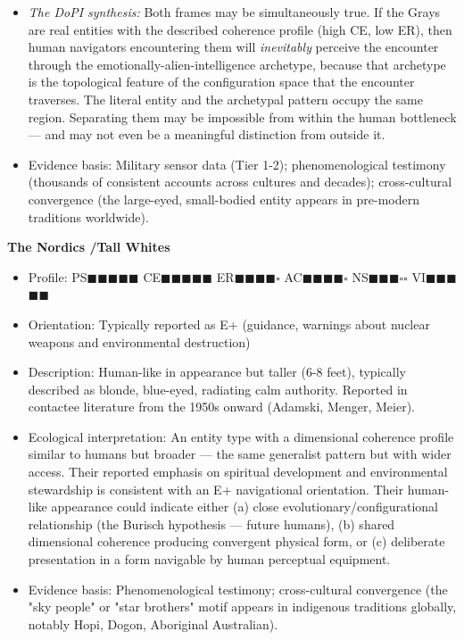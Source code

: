 \begin{itemize}[nosep,leftmargin=*]
  \item \textit{The DoPI synthesis:} Both frames may be simultaneously true. If the Grays are real entities with the described coherence profile (high CE, low ER), then human navigators encountering them will \textit{inevitably} perceive the encounter through the emotionally-alien-intelligence archetype, because that archetype is the topological feature of the configuration space that the encounter traverses. The literal entity and the archetypal pattern occupy the same region. Separating them may be impossible from within the human bottleneck — and may not even be a meaningful distinction from outside it.
  \item Evidence basis: Military sensor data (Tier 1-2); phenomenological testimony (thousands of consistent accounts across cultures and decades); cross-cultural convergence (the large-eyed, small-bodied entity appears in pre-modern traditions worldwide).
\end{itemize}


\textbf{The Nordics /\allowbreak  Tall Whites}

\begin{itemize}[nosep,leftmargin=*]
  \item Profile: PS$\blacksquare$$\blacksquare$$\blacksquare$$\blacksquare$$\blacksquare$ CE$\blacksquare$$\blacksquare$$\blacksquare$$\blacksquare$$\blacksquare$ ER$\blacksquare$$\blacksquare$$\blacksquare$$\blacksquare$$\square$ AC$\blacksquare$$\blacksquare$$\blacksquare$$\blacksquare$$\square$ NS$\blacksquare$$\blacksquare$$\blacksquare$$\square$$\square$ VI$\blacksquare$$\blacksquare$$\blacksquare$$\blacksquare$$\blacksquare$
  \item Orientation: Typically reported as E+ (guidance, warnings about nuclear weapons and environmental destruction)
  \item Description: Human-like in appearance but taller (6-8 feet), typically described as blonde, blue-eyed, radiating calm authority. Reported in contactee literature from the 1950s onward (Adamski, Menger, Meier).
  \item Ecological interpretation: An entity type with a dimensional coherence profile similar to humans but broader — the same generalist pattern but with wider access. Their reported emphasis on spiritual development and environmental stewardship is consistent with an E+ navigational orientation. Their human-like appearance could indicate either (a) close evolutionary/\allowbreak configurational relationship (the Burisch hypothesis — future humans), (b) shared dimensional coherence producing convergent physical form, or (c) deliberate presentation in a form navigable by human perceptual equipment.
  \item Evidence basis: Phenomenological testimony; cross-cultural convergence (the "sky people" or "star brothers" motif appears in indigenous traditions globally, notably Hopi, Dogon, Aboriginal Australian).
\end{itemize}


